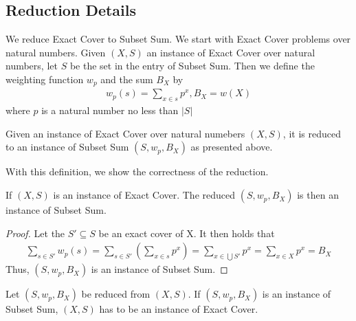 \subsection{Reduction Details}
We reduce Exact Cover to Subset Sum. We start with Exact Cover problems over natural numbers. 
Given $(X, S)$ an instance of Exact Cover over natural numbers, let $S$ be the set in the entry of Subset Sum. Then we
define the weighting function $w_{p}$ and the sum $B_{X}$ by 
\begin{align*}
    w_p(s) = \sum_{x \in s} p^x , B_X = w(X)
\end{align*}
where $p$ is a natural number no less than $|S|$
\begin{definition}[Reduction XC to SS]
    Given an instance of Exact Cover over natural numebers $(X, S)$, 
    it is reduced to an instance of Subset Sum $(S, w_p, B_X)$ as presented above.
\end{definition}
With this definition, we show the correctness of the reduction.
\begin{lemma}[Soundness]
    If $(X, S)$ is an instance of Exact Cover. The reduced $(S, w_p, B_X)$ is then an instance of Subset Sum. 
\end{lemma}
\begin{proof}
    Let the $S' \subseteq S$ be an exact cover of X. It then holds that
\begin{align*}
    \sum_{s \in S'} w_p(s) = \sum_{s \in S'} (\sum_{x \in s} p^x) = \sum_{x \in \bigcup S'} p^x = \sum_{x \in X} p^x = B_X
\end{align*}
Thus, $(S, w_p, B_X)$ is an instance of Subset Sum. 
\end{proof}
\begin{lemma}[Completeness]
    Let $(S, w_p, B_X)$ be reduced from $(X, S)$. If $(S, w_p, B_X)$ is an instance of Subset Sum, 
    $(X, S)$ has to be an instance of Exact Cover. 
\end{lemma}
